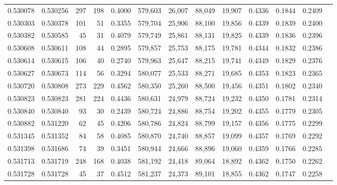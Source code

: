 \begin{tabular}{rrrrrrrrrrrrr}
0.530078 & 0.530256 &   297 &   198 &                                     0.4000 & 579,603 &  26,007 &  88,049 &  19,907 & 0.4336 & 0.1844 & 0.2409 \\
0.530303 & 0.530378 &   101 &    51 &                                     0.3355 & 579,704 &  25,906 &  88,100 &  19,856 & 0.4339 & 0.1839 & 0.2400 \\
0.530382 & 0.530585 &    45 &    31 &                                     0.4079 & 579,749 &  25,861 &  88,131 &  19,825 & 0.4339 & 0.1836 & 0.2396 \\
0.530608 & 0.530611 &   108 &    44 &                                     0.2895 & 579,857 &  25,753 &  88,175 &  19,781 & 0.4344 & 0.1832 & 0.2386 \\
0.530614 & 0.530615 &   106 &    40 &                                     0.2740 & 579,963 &  25,647 &  88,215 &  19,741 & 0.4349 & 0.1829 & 0.2376 \\
0.530627 & 0.530673 &   114 &    56 &                                     0.3294 & 580,077 &  25,533 &  88,271 &  19,685 & 0.4353 & 0.1823 & 0.2365 \\
0.530720 & 0.530808 &   273 &   229 &                                     0.4562 & 580,350 &  25,260 &  88,500 &  19,456 & 0.4351 & 0.1802 & 0.2340 \\
0.530823 & 0.530823 &   281 &   224 &                                     0.4436 & 580,631 &  24,979 &  88,724 &  19,232 & 0.4350 & 0.1781 & 0.2314 \\
0.530840 & 0.530840 &    93 &    30 &                                     0.2439 & 580,724 &  24,886 &  88,754 &  19,202 & 0.4355 & 0.1779 & 0.2305 \\
0.530882 & 0.531220 &    62 &    45 &                                     0.4206 & 580,786 &  24,824 &  88,799 &  19,157 & 0.4356 & 0.1775 & 0.2299 \\
0.531345 & 0.531352 &    84 &    58 &                                     0.4085 & 580,870 &  24,740 &  88,857 &  19,099 & 0.4357 & 0.1769 & 0.2292 \\
0.531398 & 0.531686 &    74 &    39 &                                     0.3451 & 580,944 &  24,666 &  88,896 &  19,060 & 0.4359 & 0.1766 & 0.2285 \\
0.531713 & 0.531719 &   248 &   168 &                                     0.4038 & 581,192 &  24,418 &  89,064 &  18,892 & 0.4362 & 0.1750 & 0.2262 \\
0.531728 & 0.531728 &    45 &    37 &                                     0.4512 & 581,237 &  24,373 &  89,101 &  18,855 & 0.4362 & 0.1747 & 0.2258 \\

\end{tabular}

